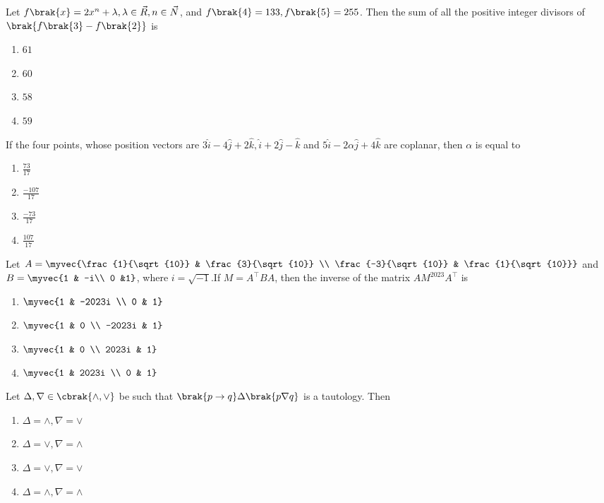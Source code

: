     \item Let $f\brak{x}=2x^n+\lambda,\lambda \in \vec{R},n \in \vec{N}$, and $f\brak{4}=133, f\brak{5}=255$. Then the sum of all the positive integer divisors of $\brak{f\brak{3}-f\brak{2}}$ is \hfill{}
    \begin{enumerate}
        \item $61$
        \item $60$
        \item $58$
        \item $59$
    \end{enumerate}
    \item If the four points, whose position vectors are $3\hat{i}-4\hat{j}+2\hat{k},\hat{i}+2\hat{j}-\hat{k}$ and $5\hat{i}-2\alpha\hat{j}+4\hat{k}$ are coplanar, then $\alpha$ is equal to \hfill{}
    \begin{enumerate}
        \item $\frac{73}{17}$
        \item $\frac{-107}{17}$
        \item $\frac{-73}{17}$
        \item $\frac{107}{17}$
    \end{enumerate}
    \item Let $A=\myvec{\frac{1}{\sqrt{10}} & \frac{3}{\sqrt{10}} \\ \frac{-3}{\sqrt{10}} & \frac{1}{\sqrt{10}}}$ and $B=\myvec{1 & -i\\ 0 &1}$, where $i=\sqrt{-1}$.If $M=A^\top BA$, then the inverse of the matrix $AM^{2023}A^\top$ is \hfill{}
    \begin{enumerate}
        \item $\myvec{1 & -2023i \\ 0 & 1}$
        \item $\myvec{1 & 0 \\ -2023i & 1}$
        \item $\myvec{1 & 0 \\ 2023i & 1}$
        \item $\myvec{1 & 2023i \\ 0 & 1}$
    \end{enumerate}
    \item Let $\Delta,\nabla \in \cbrak{\wedge,\vee}$ be such that $\brak{p \to q}\Delta\brak{p\nabla q}$ is a tautology. Then \hfill{}
    \begin{enumerate}
        \item $\Delta=\wedge,\nabla=\vee$
        \item $\Delta=\vee,\nabla=\wedge$
        \item $\Delta=\vee,\nabla=\vee$
        \item $\Delta=\wedge,\nabla=\wedge$
    \end{enumerate}
